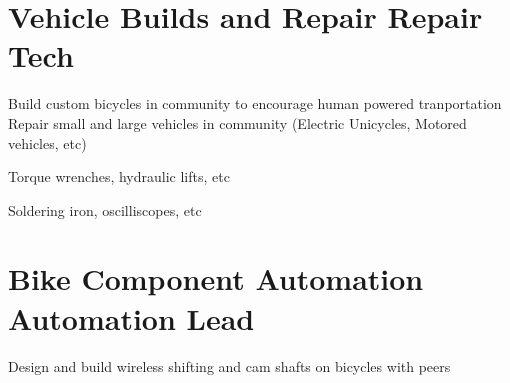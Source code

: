 \vspace{0.5ex}


\section{
    \textbf{Vehicle Builds and Repair} \newline
    Repair Tech
}{}

\vspace{-2.5ex}

\begin{detail}
    \BulletItem
    Build custom bicycles in community to encourage human powered tranportation
    \BulletItem
    Repair small and large vehicles in community (Electric Unicycles, Motored vehicles, etc)
\end{detail}

\begin{subtitle}
    \vspace{-5ex}
    {{}} 
\end{subtitle}

\vspace{-1.5ex}
{
    \vspace{-0.8ex}
    \color{cyan}\small
    {Torque wrenches, hydraulic lifts, etc}
}

{
    \vspace{-2.5ex}\hspace{3in}
    \color{cyan}\small
    {Soldering iron, oscilliscopes, etc}
}

\vspace{0.5ex}


\section{
    \textbf{Bike Component Automation} \newline
    Automation Lead
}{}

\vspace{-2.5ex}

\begin{detail}
    \BulletItem
    Design and build wireless shifting and cam shafts on bicycles with peers
\end{detail}

